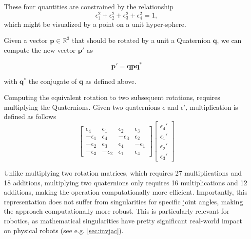 These four quantities are constrained by the relationship
\begin{equation}
\epsilon_1^2+\epsilon_2^2+\epsilon_3^2+\epsilon_4^2=1,
\end{equation}
which might be visualized by a point on a unit hyper-sphere. %

Given a vector $\mathbf{p} \in \mathbb{R}^3$ that should be rotated by a unit a Quaternion $\mathbf{q}$, we can compute the new vector $\mathbf{p'}$ as

\begin{equation}
\mathbf{p'}=\mathbf{q}\mathbf{p}\mathbf{q^*}
\end{equation}

with $\mathbf{q^*}$ the conjugate of $\mathbf{q}$ as defined above.


Computing the equivalent rotation to two subsequent rotations, requires multiplying the Quaternions. Given two quaternions $\epsilon$ and $\epsilon'$, multiplication is defined as follows
\begin{equation}
\left[
\begin{array}{cccc}
\epsilon_4 & \epsilon_1 & \epsilon_2 & \epsilon_3\\
-\epsilon_1 & \epsilon_4 & -\epsilon_3 & \epsilon_2\\
-\epsilon_2 & \epsilon_3 & \epsilon_4 & -\epsilon_1\\
-\epsilon_3 & -\epsilon_2 & \epsilon_1 & \epsilon_4
\end{array}
\right]
\left[\begin{array}{c}\epsilon_4'\\\epsilon_1'\\\epsilon_2'\\\epsilon_3'\end{array}\right]
\end{equation}

Unlike multiplying two rotation matrices, which requires 27 multiplications and 18 additions, multiplying two quaternions only requires 16 multiplications and 12 additions, making the operation computationally more efficient.
Importantly, this representation does not suffer from singularities for specific joint angles, making the approach computationally more robust. This is particularly relevant for robotics, as mathematical singularities have pretty significant real-world impact on physical robots (see e.g. \cref{sec:invjac}).



